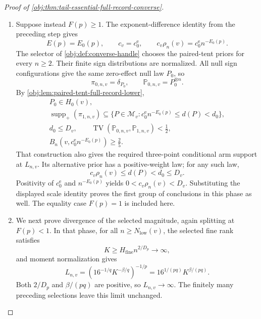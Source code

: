 \begin{proof}[Proof of \cref{obj:thm:tail-essential-full-record-converse}]
\begin{enumerate}
Finally, normalization and nonnegative weights ensure that the
alternative prior has a positive-weight law. Choosing such a law \(P\)
gives
\[
c_v\rho_n(v)\le d(P)<d_0\le D_v.
\]
Moreover, \(N_{\mathrm{low}}(v)\ge2\), \(k_v>0\), and
\(c_0^{\mathrm e}>0\), so the defining minimum for \(c_v\) is positive.
Since \(n>0\), also \(\rho_n(v)>0\). Hence
\[
0<c_v\rho_n(v)<D_v,
\]
and every positive-weight alternative law has distance strictly below
\(D_v\). This proves the first group of conclusions in the rough phase.

\item
Suppose instead \(F(p)\ge1\). The exponent-difference identity from the
preceding step gives
\[
E(p)=E_0(p),\qquad
c_v=c_0^{\mathrm e},\qquad
c_v\rho_n(v)=c_0^{\mathrm e}n^{-E_0(p)}.
\]
The selector of \cref{obj:def:converse-handle} chooses the paired-tent
priors for every \(n\ge2\). Their finite sign distributions are
normalized. All null sign configurations give the same zero-effect
null law \(P_0\), so
\[
\pi_{0,n,v}=\delta_{P_0},\qquad
\mathbb P_{0,n,v}=P_0^{\otimes n}.
\]
By \cref{obj:lem:paired-tent-full-record-lower},
\[
\begin{gathered}
P_0\in H_0(v),\\
\operatorname{supp}_+(\pi_{1,n,v})
\subseteq
\{P\in\mathcal M_v:
c_0^{\mathrm e}n^{-E_0(p)}\le d(P)<d_0\},\\
d_0\le D_v,\qquad
\operatorname{TV}(\mathbb P_{0,n,v},\mathbb P_{1,n,v})<\frac12,\\
B_n(v,c_0^{\mathrm e}n^{-E_0(p)})\ge\frac25.
\end{gathered}
\]
That construction also gives the required three-point conditional arm
support at \(L_{n,v}\). Its alternative prior has a positive-weight
law; for any such law,
\[
c_v\rho_n(v)\le d(P)<d_0\le D_v.
\]
Positivity of \(c_0^{\mathrm e}\) and \(n^{-E_0(p)}\) yields
\(0<c_v\rho_n(v)<D_v\). Substituting the displayed scale identity proves
the first group of conclusions in this phase as well. The equality
case \(F(p)=1\) is included here.

\item
We next prove divergence of the selected magnitude, again splitting at
\(F(p)<1\). In that phase, for all
\(n\ge N_{\mathrm{low}}(v)\), the selected fine rank satisfies
\[
K\ge H_{\mathrm{fine}}n^{2/D_p}\longrightarrow\infty,
\]
and moment normalization gives
\[
L_{n,v}
=
\left(16^{-1/q}K^{-\beta/q}\right)^{-1/p}
=
16^{1/(pq)}K^{\beta/(pq)}.
\]
Both \(2/D_p\) and \(\beta/(pq)\) are positive, so
\(L_{n,v}\to\infty\). The finitely many preceding selections leave this
limit unchanged.


\end{enumerate}
\end{proof}

